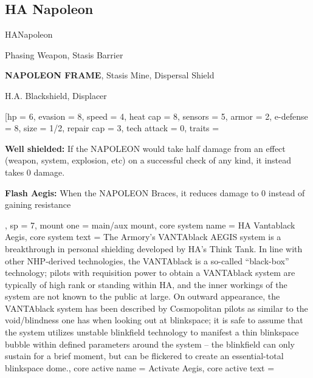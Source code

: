 \subsection{HA Napoleon}

\begin{mech}{HA}{Napoleon}


\begin{license}
\item Phasing Weapon, Stasis Barrier
\item \textbf{NAPOLEON FRAME}, Stasis Mine, Dispersal Shield
\item H.A. Blackshield, Displacer
\end{license}

\frameBox
[hp = 6,
evasion = 8,
speed = 4,
heat cap = 8,
sensors = 5,
armor = 2,
e-defense = 8,
size = 1/2,
repair cap = 3,
tech attack = 0,
traits = {\textbf{Well shielded:} If the NAPOLEON would take half damage from an effect (weapon, system, explosion, etc) on a successful check of any kind, it instead takes 0 damage.

\textbf{Flash Aegis:} When the NAPOLEON Braces, it reduces damage to 0 instead of gaining resistance},
sp = 7,
mount one = main/aux mount,
core system name = HA Vantablack Aegis,
core system text = {The Armory’s VANTAblack AEGIS system is a breakthrough in personal shielding developed by HA’s Think Tank. In line with other NHP-derived technologies, the VANTAblack is a so-called “black-box” technology; pilots with requisition power to obtain a VANTAblack system are typically of high rank or standing within HA, and the inner workings of the system are not known to the public at large. On outward appearance, the VANTAblack system has been described by Cosmopolitan pilots as similar to the void/blindness one has when looking out at blinkspace; it is safe to assume that the system utilizes unstable blinkfield technology to manifest a thin blinkspace bubble within defined parameters around the system -- the blinkfield can only sustain for a brief moment, but can be flickered to create an essential-total blinkspace dome.},
core active name = Activate Aegis,
core active text ={\QuickAction

}
\end{mech}
